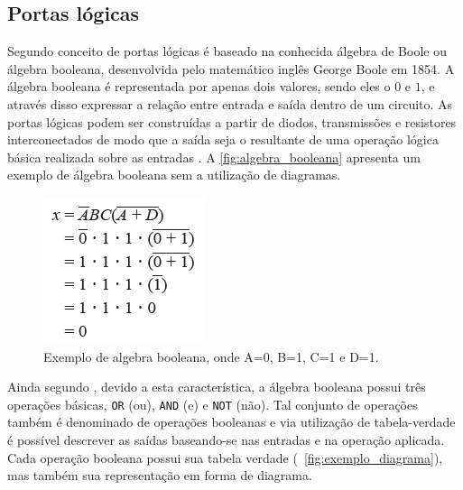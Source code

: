 \subsection{Portas lógicas}

Segundo \citeauthor{idoeta1982elementos} conceito de portas lógicas é baseado na conhecida álgebra de Boole ou álgebra booleana, desenvolvida pelo matemático inglês George Boole em 1854. A álgebra booleana é representada por apenas dois valores, sendo eles o $0$ e $1$, e através disso expressar a relação entre entrada e saída dentro de um circuito. As portas lógicas podem ser construídas a partir de diodos, transmissões e resistores interconectados de modo que a saída seja o resultante de uma operação lógica básica realizada sobre as entradas \cite{tocci2003sistemas}. A \autoref{fig:algebra_booleana} apresenta um exemplo de álgebra booleana sem a utilização de diagramas.

\begin{figure}[!htbp]
	\begin{center}
    \caption{\label{fig:algebra_booleana}Exemplo de algebra booleana, onde A=0, B=1, C=1 e D=1.}
	\includegraphics[scale=0.70]{Figuras/algebra_booleana.png}
	\end{center}
\end{figure}

\par
Ainda segundo \citeauthor{tocci2003sistemas}, devido a esta característica, a álgebra booleana possui três operações básicas, \texttt{OR} (ou), \texttt{AND} (e) e \texttt{NOT} (não). Tal conjunto de operações também é denominado de operações booleanas e via utilização de tabela-verdade é possível descrever as saídas baseando-se nas entradas e na operação aplicada. Cada operação booleana possui sua tabela verdade (~\autoref{fig:exemplo_diagrama}), mas também sua representação em forma de diagrama.

